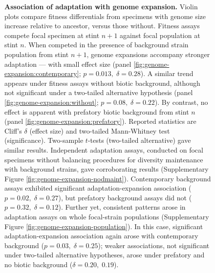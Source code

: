 \begin{figure}
\caption{
    \textbf{Association of adaptation with genome expansion.}
    \footnotesize
    Violin plots compare fitness differentials from specimens with genome size increase relative to ancestor, versus those without.
    Fitness assays compete focal specimen at stint $n+1$ against focal population at stint $n$.
    When competed in the presence of background strain population from stint $n+1$, genome expansions accompany stronger adaptation --- with small effect size (panel \ref{fig:genome-expansion:contemporary}; $p = 0.013, \; \delta = 0.28$).
    A similar trend appears under fitness assays without biotic background, although not significant under a two-tailed alternative hypothesis (panel \ref{fig:genome-expansion:without}; $p=0.08, \; \delta = 0.22$).
    By contrast, no effect is apparent with prefatory biotic background from stint $n$ (panel \ref{fig:genome-expansion:prefatory}).
    Reported statistics are Cliff's $\delta$ (effect size) and two-tailed Mann-Whitney test (significance).
    Two-sample $t$-tests (two-tailed alternative) gave similar results.
    Independent adaptation assays, conducted on focal specimens without balancing procedures for diversity maintenance with background strains, gave corroborating results (Supplementary Figure \ref{fig:genome-expansion-nodmaint}).
    Contemporary background assays exhibited significant adaptation-expansion association ($p=0.02, \; \delta=0.27$), but prefatory background assays did not ($p=0.32, \; \delta=0.12$).
    Further yet, consistent patterns arose in adaptation assays on whole focal-strain populations (Supplementary Figure \ref{fig:genome-expansion-population}).
    In this case, significant adaptation-expansion association again arose with contemporary background ($p=0.03, \; \delta=0.25$);
    weaker associations, not significant under two-tailed alternative hypotheses, arose under prefatory and no biotic background ($\delta=0.20,\; 0.19$).
}
\label{fig:genome-expansion}

\end{figure}
